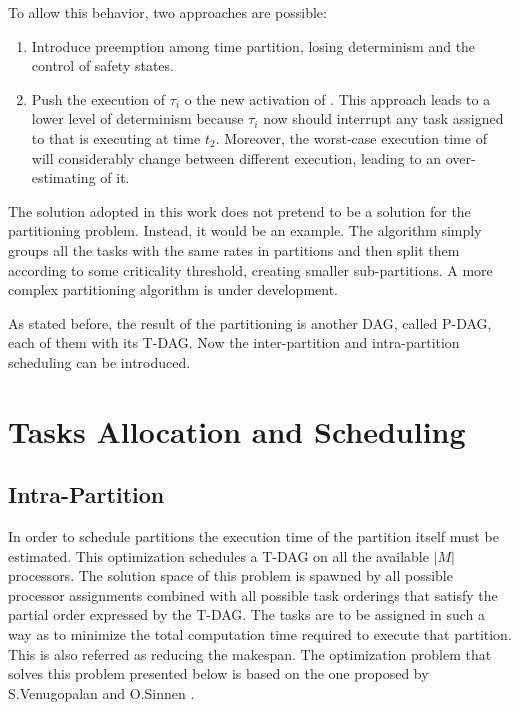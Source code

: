 To allow this behavior, two approaches are possible:
\begin{enumerate}
\item Introduce preemption among time partition, losing determinism and the control of safety states.
\item Push the execution of $\tau_i$ o the new activation of . This approach leads to a lower level of determinism because $\tau_i$ now should interrupt any task assigned to  that is executing at time $t_2$. Moreover, the worst-case execution time of  will considerably change between different execution, leading to an over-estimating of it.
\end{enumerate}
The solution adopted in this work does not pretend to be a solution for the partitioning problem. Instead, it would be an example. The algorithm simply groups all the tasks with the same rates in partitions and then split them according to some criticality threshold, creating smaller sub-partitions. A more complex partitioning algorithm is under development.
\par As stated before, the result of the partitioning is another DAG, called P-DAG, each of them with its T-DAG. Now the inter-partition and intra-partition scheduling can be introduced. 

\section{Tasks Allocation and Scheduling}
\subsection{Intra-Partition}
In order to schedule partitions the execution time of the partition itself must be estimated. This optimization schedules a T-DAG on all the available $|M|$ processors. The solution space of this problem is spawned by all possible processor assignments combined with all possible task orderings that satisfy the partial order expressed by the T-DAG. The tasks are to be assigned in such a way as to minimize the total computation time required to execute that partition. This is also referred as reducing the makespan. The optimization problem that solves this problem presented below is based on the one proposed by S.Venugopalan and O.Sinnen \cite{ILP}.

